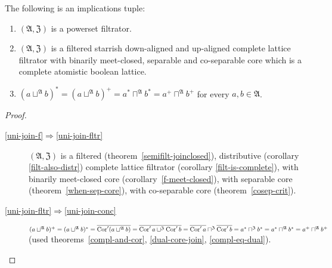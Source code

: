 \begin{thm}
The following is an implications tuple:
\begin{enumerate}
\item \label{uni-join-f}$(\mathfrak{A},\mathfrak{Z})$ is a powerset filtrator.
\item \label{uni-join-fltr}$(\mathfrak{A},\mathfrak{Z})$ is a filtered
starrish down-aligned and up-aligned complete lattice filtrator with binarily meet-closed,
separable and co-separable core which is a complete atomistic boolean lattice.
\item \label{uni-join-conc}$(a\sqcup^{\mathfrak{A}}b)^{\ast}=(a\sqcup^{\mathfrak{A}}b)^{+}=a^{\ast}\sqcap^{\mathfrak{A}}b^{\ast}=a^{+}\sqcap^{\mathfrak{A}}b^{+}$
for every $a,b\in\mathfrak{A}$.
\end{enumerate}
\end{thm}
\begin{proof}
~
\begin{description}
\item [{\ref{uni-join-f}$\Rightarrow$\ref{uni-join-fltr}}] $(\mathfrak{A},\mathfrak{Z})$
is a filtered (theorem~\ref{semifilt-joinclosed}), distributive
(corollary \ref{filt-also-distr}) complete lattice filtrator (corollary
\ref{filt-is-complete}), with binarily meet-closed core (corollary~\ref{f-meet-closed}),
with separable core (theorem~\ref{when-sep-core}), with co-separable core (theorem~\ref{cosep-crit}).
\item [{\ref{uni-join-fltr}$\Rightarrow$\ref{uni-join-conc}}] $(a\sqcup^{\mathfrak{A}}b)^{+}=(a\sqcup^{\mathfrak{A}}b)^{\ast}=\overline{\operatorname{Cor}'(a\sqcup^{\mathfrak{A}}b)}=\overline{\operatorname{Cor}'a\sqcup^{\mathfrak{Z}}\operatorname{Cor}'b}=\overline{\operatorname{Cor}'a}\sqcap^{\mathfrak{Z}}\overline{\operatorname{Cor}'b}=a^{\ast}\sqcap^{\mathfrak{Z}}b^{\ast}=a^{\ast}\sqcap^{\mathfrak{A}}b^{\ast}=a^{+}\sqcap^{\mathfrak{A}}b^{+}$
(used theorems~\ref{compl-and-cor}, \ref{dual-core-join}, \ref{compl-eq-dual}).
\end{description}
\end{proof}

